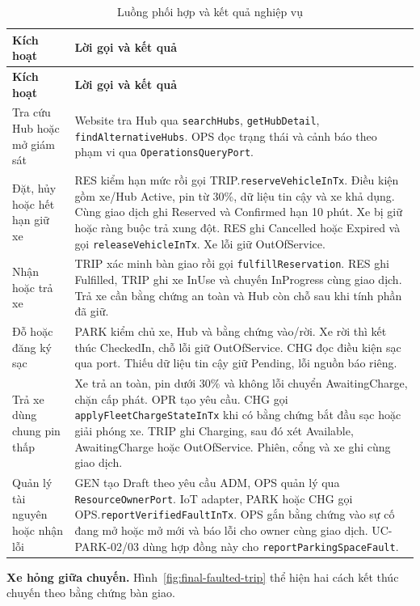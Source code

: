 \begin{longtable}{|L{28mm}|L{117mm}|}
\caption{Luồng phối hợp và kết quả nghiệp vụ}\\\hline
\textbf{Kích hoạt} & \textbf{Lời gọi và kết quả}\\\hline
\endfirsthead
\hline\textbf{Kích hoạt} & \textbf{Lời gọi và kết quả}\\\hline
\endhead
Tra cứu Hub hoặc mở giám sát &
Website tra Hub qua \texttt{searchHubs}, \texttt{getHubDetail}, \texttt{findAlternativeHubs}. OPS đọc trạng thái và cảnh báo theo phạm vi qua \texttt{OperationsQueryPort}.\\\hline
Đặt, hủy hoặc hết hạn giữ xe &
RES kiểm hạn mức rồi gọi TRIP.\allowbreak\texttt{reserveVehicleInTx}. Điều kiện gồm xe/Hub Active, pin từ 30\%, dữ liệu tin cậy và xe khả dụng. Cùng giao dịch ghi Reserved và Confirmed hạn 10 phút. Xe bị giữ hoặc ràng buộc trả xung đột. RES ghi Cancelled hoặc Expired và gọi \texttt{releaseVehicleInTx}. Xe lỗi giữ OutOfService.\\\hline
Nhận hoặc trả xe &
TRIP xác minh bàn giao rồi gọi \texttt{fulfillReservation}. RES ghi Fulfilled, TRIP ghi xe InUse và chuyến InProgress cùng giao dịch. Trả xe cần bằng chứng an toàn và Hub còn chỗ sau khi tính phần đã giữ.\\\hline
Đỗ hoặc đăng ký sạc &
PARK kiểm chủ xe, Hub và bằng chứng vào/rời. Xe rời thì kết thúc CheckedIn, chỗ lỗi giữ OutOfService. CHG đọc điều kiện sạc qua port. Thiếu dữ liệu tin cậy giữ Pending, lỗi nguồn báo riêng.\\\hline
Trả xe dùng chung pin thấp &
Xe trả an toàn, pin dưới 30\% và không lỗi chuyển AwaitingCharge, chặn cấp phát. OPR tạo yêu cầu. CHG gọi \texttt{applyFleetChargeStateInTx} khi có bằng chứng bắt đầu sạc hoặc giải phóng xe. TRIP ghi Charging, sau đó xét Available, AwaitingCharge hoặc OutOfService. Phiên, cổng và xe ghi cùng giao dịch.\\\hline
Quản lý tài nguyên hoặc nhận lỗi &
GEN tạo Draft theo yêu cầu ADM, OPS quản lý qua \texttt{ResourceOwnerPort}. IoT adapter, PARK hoặc CHG gọi OPS.\allowbreak\texttt{reportVerifiedFaultInTx}. OPS gắn bằng chứng vào sự cố đang mở hoặc mở mới và báo lỗi cho owner cùng giao dịch. UC-PARK-02/03 dùng hợp đồng này cho \texttt{reportParkingSpaceFault}.\\\hline
\end{longtable}

\noindent\textbf{Xe hỏng giữa chuyến.} Hình~\ref{fig:final-faulted-trip} thể hiện hai cách kết thúc chuyến theo bằng chứng bàn giao.

